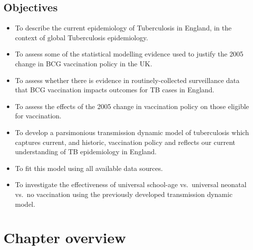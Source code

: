 \documentclass[11pt,twoside]{bristolthesis}
\providecommand{\tightlist}{%
  \setlength{\itemsep}{0pt}\setlength{\parskip}{0pt}}
\begin{document}
  \hypertarget{objectives}{%
  \subsection{Objectives}\label{objectives}}
  \begin{itemize}
  \tightlist
  \item
    To describe the current epidemiology of Tuberculosis in England, in the context of global Tuberculosis epidemiology.
  \item
    To assess some of the statistical modelling evidence used to justify the 2005 change in BCG vaccination policy in the UK.
  \item
    To assess whether there is evidence in routinely-collected surveillance data that BCG vaccination impacts outcomes for TB cases in England.
  \item
    To assess the effects of the 2005 change in vaccination policy on those eligible for vaccination.
  \item
    To develop a parsimonious transmission dynamic model of tuberculosis which captures current, and historic, vaccination policy and reflects our current understanding of TB epidemiology in England.
  \item
    To fit this model using all available data sources.
  \item
    To investigate the effectiveness of universal school-age vs.~universal neonatal vs.~no vaccination using the previously developed transmission dynamic model.
  \end{itemize}
  \hypertarget{chapter-overview}{%
  \section{Chapter overview}\label{chapter-overview}}
\end{document}
